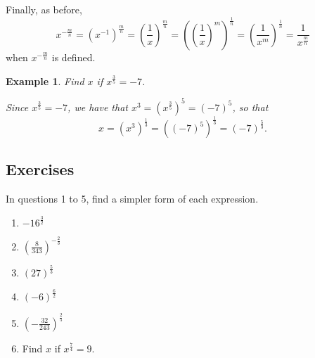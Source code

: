 \documentclass[11pt]{book}               %
\newtheorem{example}{Example}
\begin{document}
Finally, as before, 
$$x^{-\frac{m}{n}} = \left(x^{-1}\right)^\frac{m}{n} = \left(\frac{1}{x}\right)^\frac{m}{n} 
= \left(\left(\frac{1}{x}\right)^m\right)^\frac{1}{n} 
= \left(\frac{1}{x^m}\right)^\frac{1}{n} =\frac{1}{x^\frac{m}{n}}
$$
when $x^{-\frac{m}{n}}$ is defined.
 
%
%
%

%

\begin{example}
Find $x$ if $x^\frac{3}{5} = -7$.

\normalfont
Since $x^\frac{3}{5} = -7$, we have that
$x^3 = \left(x^\frac{3}{5}\right)^5 = (-7)^5$, so that
$$x = \left(x^3\right)^\frac{1}{3} = \left((-7)^5\right)^\frac{1}{3} = (-7)^\frac{5}{3}.$$
\end{example}

\subsection{Exercises}
In questions 1 to 5, find a simpler form of each expression.
\begin{enumerate}
\item $ -16^\frac{3}{2} $ 
\item $(\frac{8}{343})^{-\frac{2}{3}}  $ 
\item $ (27)^\frac{5}{3} $ 
\item $ (-6)^{\frac{6}{2}} $ 
\item $ (-\frac{32}{243})^\frac{2}{5} $ 

\bigskip
\item Find $x$ if $x^{\frac{7}{4}} = 9$.
\end{enumerate}
\end{document}
